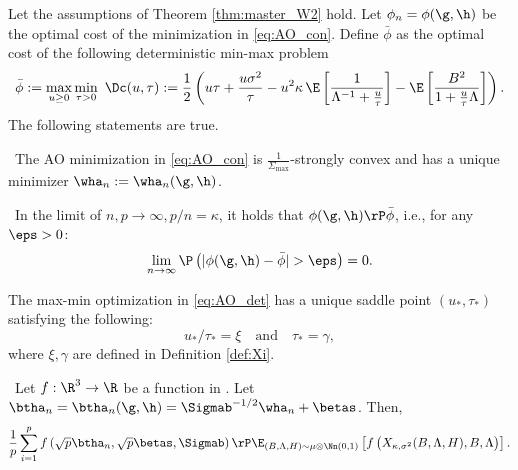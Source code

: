 \begin{lemma}\label{lem:AO}
{Let the assumptions of Theorem \ref{thm:master_W2} hold.} Let $\phi_n=\phi(\g,\h)$ be the optimal cost of the minimization in \eqref{eq:AO_con}. Define $\bar\phi$ as the optimal cost of the following deterministic min-max problem
\begin{align}\label{eq:AO_det}
\bar\phi:=\max_{u\geq 0}\min_{\tau>0}~ \Dc(u,\tau):=\frac{1}{2}\left({u\tau} + \frac{u\sigma^2}{\tau} - u^2\kappa\,\E\left[ \frac{1}{\Lambda^{-1}+\frac{u}{\tau}} \right] - {\E\left[\frac{B^2}{1+\frac{u}{\tau}\Lambda}\right]} \right).
\end{align}
The following statements are true.

~The AO minimization in \eqref{eq:AO_con} is $\frac{1}{\Sigma_{\max}}$-strongly convex and has a unique minimizer $\wha_n:=\wha_n(\g,\h)$.

~In the limit of $n,p\rightarrow\infty, p/n=\kappa$, it holds that $\phi(\g,\h)\rP\bar\phi$, i.e., for any $\eps>0$:
$$
\lim_{n\rightarrow\infty}\P\left(|\phi(\g,\h)-\bar\phi|>\eps\right) = 0.
$$

 The max-min optimization in \eqref{eq:AO_det} has a unique saddle point $(u_*,\tau_*)$ satisfying the following: 
$$
u_*/\tau_* = \xi\quad\text{and}\quad\tau_* = \gamma,
$$
where $\xi, \gamma$ are defined in Definition \ref{def:Xi}.


~Let $f:\R^3\rightarrow\R$ be a function in . Let $\btha_n=\btha_n(\g,\h)=\Sigmab^{-1/2}\wha_n + \betas$. Then,
$$
\frac{1}{p}\sum_{i=1}^{p}f\left(\sqrt{p}\btha_n,\sqrt{p}\betas,\Sigmab\right) \rP \E_{(B,\Lambda,H)\sim\mu\otimes	\Nn(0,1)}\left[f\left(X_{\kappa,\sigma^2}(B,\Lambda,H),B,\Lambda\right) \right].
$$


~



\end{lemma}




